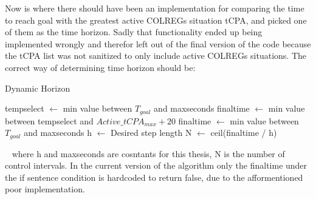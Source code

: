 Now is where there should have been an implementation for comparing the time to reach goal with the greatest active COLREGs situation tCPA, and picked
one of them as the time horizon. Sadly that functionality ended up being implemented wrongly and therefor left out of the final version of the code
because the tCPA list was not sanitized to only include active COLREGs situations. The correct way of determining time horizon should be:
\begin{algorithm}[h]
    \caption{Dynamic Horizon} \label{ALG: DynamicHorizon}
    \begin{algorithmic}
            \State \textrm{tempselect} $\gets$ \textrm{min value between $T_{goal}$ and maxseconds}
            \State \textrm{finaltime} $\gets$ \textrm{min value between tempselect and $Active\_tCPA_{max} + 20$}
        \Else
            \State \textrm{finaltime} $\gets$ \textrm{min value between $T_{goal}$ and maxseconds}
        \EndIf
        \State \textrm{h} $\gets$ \textrm{Desired step length}
        \State \textrm{N} $\gets$ \textrm{ceil(finaltime / h)}
    \end{algorithmic}
\end{algorithm}
 \newline
where h and maxseconds are cosntants for this thesis, N is the number of control intervals. In the current version of the algorithm only the finaltime under the if
sentence condition is hardcoded to return false, due to the afformentioned poor implementation.



